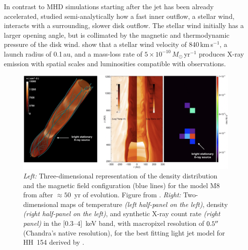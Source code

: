 \documentclass[graybox, nosecnum]{svmult}
\begin{document}
In contrast to MHD simulations starting after the jet has been already accelerated,  \citet{Guenther_2014} studied semi-analytically how a fast inner outflow, a stellar wind, interacts with a surrounding, slower disk outflow. The stellar wind initially has a larger opening angle, but is collimated by the magnetic and thermodynamic pressure of the disk wind. \citet{Guenther_2014} show that a stellar wind velocity of 840\,km\,s$^{-1}$, a launch radius of 0.1\,au, and a mass-loss rate of $5\times10^{-10}\,M_\odot$\,yr$^{-1}$ produces X-ray emission with spatial scales and luminosities compatible with observations.

\begin{figure}[t]
    \centering
    \includegraphics[width=12cm]{figs/ustamujic.png}
    \caption{\emph{Left:} Three-dimensional representation of the density distribution and the magnetic field configuration (blue lines) 
    for the model M8 from \cite{Ustamujic_2016} after $\approx 50$~yr 
    of evolution. Figure from \cite{Ustamujic_2016}.
    \emph{Right:} Two-dimensional maps of temperature \emph{(left half-panel on 
    the left)}, density \emph{(right half-panel on the left)}, and synthetic 
    X-ray count rate \emph{(right panel)} in the [$0.3–4$]~keV band, with 
    macropixel resolution of $0.5\hbox{$^{\prime\prime}$}$ (Chandra's  native resolution),
    for the best fitting light jet model for HH~154 derived
    by \cite{Ustamujic_2018}.}
    \label{fig:ustamujic}
\end{figure}
\end{document}
